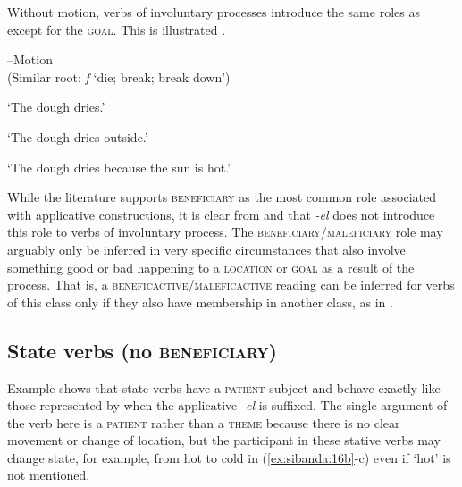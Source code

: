 \documentclass[output=paper]{langsci/langscibook}
\begin{document}
 Without motion, verbs of involuntary processes introduce the same roles as  except for the \textsc{goal.} This is illustrated .

\ea\label{ex:sibanda:15}
\settowidth{}
{ --Motion} \\
 (Similar root: \textit{f} ‘die; break; break down’)\\

\glt ‘The dough dries.’



\glt ‘The dough dries outside.’


\glt ‘The dough dries because the sun is hot.’ 
\z
\z

While the literature supports \textsc{beneficiary} as the most common role associated with applicative constructions, it is clear from  and  that \textit{-el} does not introduce this role to verbs of involuntary process. The \textsc{beneficiary}/\textsc{maleficiary} role may arguably only be inferred in very specific circumstances that also involve something good or bad happening to a \textsc{location} or \textsc{goal} as a result of the process. That is, a \textsc{beneficactive}/\textsc{maleficactive} reading can be inferred for verbs of this class only if they also have membership in another class, as in .

\subsection{State verbs (no \textsc{beneficiary)}}\label{sec:sibanda:4.5}

Example  shows that state verbs have a \textsc{patient} subject and behave exactly like those represented by  when the applicative \textit{-el} is suffixed. The single argument of the verb here is a \textsc{patient} rather than a \textsc{theme} because there is no clear movement or change of location, but the participant in these stative verbs may change state, for example, from hot to cold in (\ref{ex:sibanda:16b}-c) even if ‘hot’ is not mentioned. 
\end{document}
